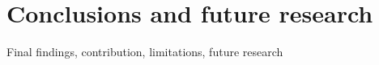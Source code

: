 \chapter{Conclusions and future research}
Final findings, contribution, limitations, future research
\label{chap:conclusions}
\newpage